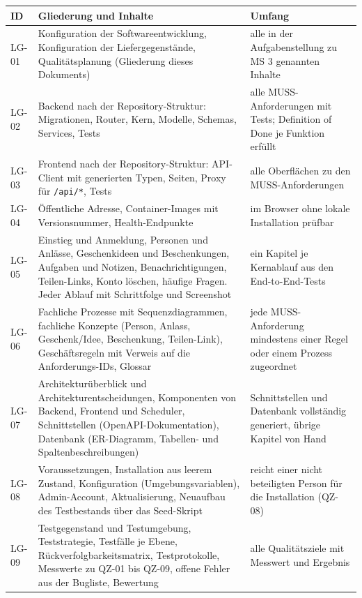 \documentclass[11pt,a4paper]{article}
\begin{document}
\begin{tabularx}{\linewidth}{@{}l >{\hsize=1.20\hsize\RaggedRight\arraybackslash}X >{\hsize=0.80\hsize\RaggedRight\arraybackslash}X@{}}
\toprule
\textbf{ID} & \textbf{Gliederung und Inhalte} & \textbf{Umfang} \\
\midrule
\endhead
LG-01 & Konfiguration der Softwareentwicklung, Konfiguration der Liefergegenstände, Qualitätsplanung (Gliederung dieses Dokuments) & alle in der Aufgabenstellung zu MS 3 genannten Inhalte \\
LG-02 & Backend nach der Repository-Struktur: Migrationen, Router, Kern, Modelle, Schemas, Services, Tests & alle MUSS-Anforderungen mit Tests; Definition of Done je Funktion erfüllt \\
LG-03 & Frontend nach der Repository-Struktur: API-Client mit generierten Typen, Seiten, Proxy für \texttt{/\allowbreak{}api/\allowbreak{}*}, Tests & alle Oberflächen zu den MUSS-Anforderungen \\
LG-04 & Öffentliche Adresse, Container-Images mit Versionsnummer, Health-Endpunkte & im Browser ohne lokale Installation prüfbar \\
LG-05 & Einstieg und Anmeldung, Personen und Anlässe, Geschenkideen und Beschenkungen, Aufgaben und Notizen, Benachrichtigungen, Teilen-Links, Konto löschen, häufige Fragen. Jeder Ablauf mit Schrittfolge und Screenshot & ein Kapitel je Kernablauf aus den End-to-End-Tests \\
LG-06 & Fachliche Prozesse mit Sequenzdiagrammen, fachliche Konzepte (Person, Anlass, Geschenk/Idee, Beschenkung, Teilen-Link), Geschäftsregeln mit Verweis auf die Anforderungs-IDs, Glossar & jede MUSS-Anforderung mindestens einer Regel oder einem Prozess zugeordnet \\
LG-07 & Architekturüberblick und Architekturentscheidungen, Komponenten von Backend, Frontend und Scheduler, Schnittstellen (OpenAPI-Dokumentation), Datenbank (ER-Diagramm, Tabellen- und Spaltenbeschreibungen) & Schnittstellen und Datenbank vollständig generiert, übrige Kapitel von Hand \\
LG-08 & Voraussetzungen, Installation aus leerem Zustand, Konfiguration (Umgebungsvariablen), Admin-Account, Aktualisierung, Neuaufbau des Testbestands über das Seed-Skript & reicht einer nicht beteiligten Person für die Installation (QZ-08) \\
LG-09 & Testgegenstand und Testumgebung, Teststrategie, Testfälle je Ebene, Rückverfolgbarkeitsmatrix, Testprotokolle, Messwerte zu QZ-01 bis QZ-09, offene Fehler aus der Bugliste, Bewertung & alle Qualitätsziele mit Messwert und Ergebnis \\

\end{tabularx}
\end{document}
